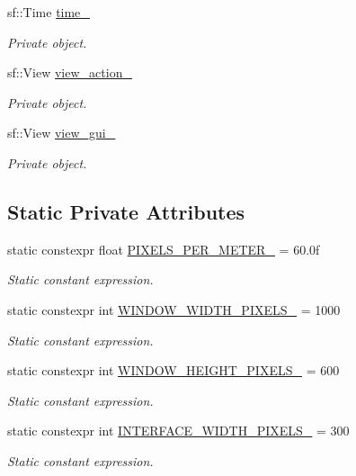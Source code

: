\begin{DoxyCompactItemize}
sf\+::\+Time \hyperlink{classGraphics_ab2983b7d90351c0f7b824ac6f887fd6d}{time\+\_\+}
\begin{DoxyCompactList}\small\item\em Private object. \end{DoxyCompactList}\item 
sf\+::\+View \hyperlink{classGraphics_a60792a296f5e93dbd1d086398e20cbd0}{view\+\_\+action\+\_\+}
\begin{DoxyCompactList}\small\item\em Private object. \end{DoxyCompactList}\item 
sf\+::\+View \hyperlink{classGraphics_aaca5b237fae17f3166f8f28e4c363e06}{view\+\_\+gui\+\_\+}
\begin{DoxyCompactList}\small\item\em Private object. \end{DoxyCompactList}\end{DoxyCompactItemize}
\subsection*{Static Private Attributes}
\begin{DoxyCompactItemize}
\item 
static constexpr float \hyperlink{classGraphics_af9c6251065c2900d0a92380c2bea26b2}{P\+I\+X\+E\+L\+S\+\_\+\+P\+E\+R\+\_\+\+M\+E\+T\+E\+R\+\_\+} = 60.\+0f
\begin{DoxyCompactList}\small\item\em Static constant expression. \end{DoxyCompactList}\item 
static constexpr int \hyperlink{classGraphics_a4e8cd4a9f4799e3b7f5e85685d6d4905}{W\+I\+N\+D\+O\+W\+\_\+\+W\+I\+D\+T\+H\+\_\+\+P\+I\+X\+E\+L\+S\+\_\+} = 1000
\begin{DoxyCompactList}\small\item\em Static constant expression. \end{DoxyCompactList}\item 
static constexpr int \hyperlink{classGraphics_a2838b79511d56711b88e677ad48c54e9}{W\+I\+N\+D\+O\+W\+\_\+\+H\+E\+I\+G\+H\+T\+\_\+\+P\+I\+X\+E\+L\+S\+\_\+} = 600
\begin{DoxyCompactList}\small\item\em Static constant expression. \end{DoxyCompactList}\item 
static constexpr int \hyperlink{classGraphics_aac15ea113ea8c69d5e54996513886110}{I\+N\+T\+E\+R\+F\+A\+C\+E\+\_\+\+W\+I\+D\+T\+H\+\_\+\+P\+I\+X\+E\+L\+S\+\_\+} = 300
\begin{DoxyCompactList}\small\item\em Static constant expression. \end{DoxyCompactList}\end{DoxyCompactItemize}


